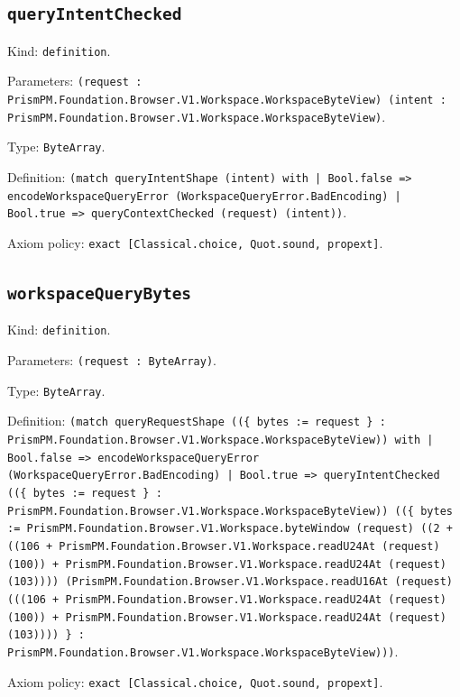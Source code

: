 \documentclass[11pt]{article}
\begin{document}
\subsection*{\texttt{queryIntentChecked}}
\noindent Kind: \texttt{definition}.\par
\noindent Parameters: \texttt{(request : PrismPM.Foundation.Browser.V1.Workspace.WorkspaceByteView) (intent : PrismPM.Foundation.Browser.V1.Workspace.WorkspaceByteView)}.\par
\noindent Type: \texttt{ByteArray}.\par
\noindent Definition: \texttt{(match queryIntentShape (intent) with | Bool.false => encodeWorkspaceQueryError (WorkspaceQueryError.BadEncoding) | Bool.true => queryContextChecked (request) (intent))}.\par
\noindent Axiom policy: \texttt{exact [Classical.choice, Quot.sound, propext]}.\par
\subsection*{\texttt{workspaceQueryBytes}}
\noindent Kind: \texttt{definition}.\par
\noindent Parameters: \texttt{(request : ByteArray)}.\par
\noindent Type: \texttt{ByteArray}.\par
\noindent Definition: \texttt{(match queryRequestShape ((\{ bytes := request \} : PrismPM.Foundation.Browser.V1.Workspace.WorkspaceByteView)) with | Bool.false => encodeWorkspaceQueryError (WorkspaceQueryError.BadEncoding) | Bool.true => queryIntentChecked ((\{ bytes := request \} : PrismPM.Foundation.Browser.V1.Workspace.WorkspaceByteView)) ((\{ bytes := PrismPM.Foundation.Browser.V1.Workspace.byteWindow (request) ((2 + ((106 + PrismPM.Foundation.Browser.V1.Workspace.readU24At (request) (100)) + PrismPM.Foundation.Browser.V1.Workspace.readU24At (request) (103)))) (PrismPM.Foundation.Browser.V1.Workspace.readU16At (request) (((106 + PrismPM.Foundation.Browser.V1.Workspace.readU24At (request) (100)) + PrismPM.Foundation.Browser.V1.Workspace.readU24At (request) (103)))) \} : PrismPM.Foundation.Browser.V1.Workspace.WorkspaceByteView)))}.\par
\noindent Axiom policy: \texttt{exact [Classical.choice, Quot.sound, propext]}.\par
\end{document}
